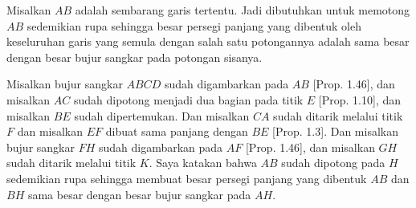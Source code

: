 \documentclass[a4paper]{book}
\begin{document}
\begin{center}
\end{center}

Misalkan $AB$ adalah sembarang garis tertentu. Jadi dibutuhkan untuk memotong
$AB$ sedemikian rupa sehingga besar persegi panjang yang dibentuk oleh 
keseluruhan garis yang semula dengan salah satu potongannya adalah sama besar
dengan besar bujur sangkar pada potongan sisanya.

Misalkan bujur sangkar $ABCD$ sudah digambarkan pada $AB$ [Prop. 1.46], dan 
misalkan $AC$ sudah dipotong menjadi dua bagian pada titik $E$ [Prop. 1.10],
dan misalkan $BE$ sudah dipertemukan. Dan misalkan $CA$ sudah ditarik melalui
titik $F$ dan misalkan $EF$ dibuat sama panjang dengan $BE$ [Prop. 1.3]. Dan
misalkan bujur sangkar $FH$ sudah digambarkan pada $AF$ [Prop. 1.46], dan 
misalkan $GH$ sudah ditarik melalui titik $K$. Saya katakan bahwa $AB$
sudah dipotong pada $H$ sedemikian rupa sehingga membuat besar persegi panjang
yang dibentuk $AB$ dan $BH$ sama besar dengan besar bujur sangkar pada $AH$.
\end{document}
